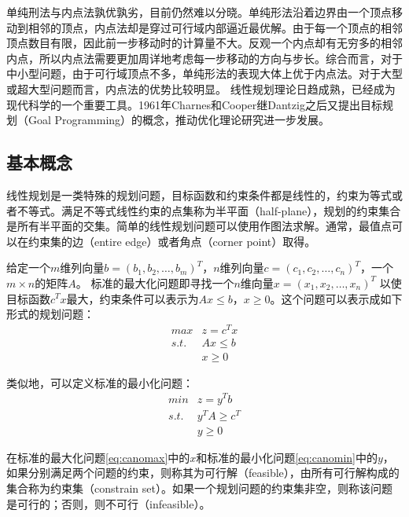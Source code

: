 单纯刑法与内点法孰优孰劣，目前仍然难以分晓。单纯形法沿着边界由一个顶点移动到相邻的顶点，内点法却是穿过可行域内部逼近最优解。由于每一个顶点的相邻顶点数目有限，因此前一步移动时的计算量不大。反观一个内点却有无穷多的相邻内点，所以内点法需要更加周详地考虑每一步移动的方向与步长。综合而言，对于中小型问题，由于可行域顶点不多，单纯形法的表现大体上优于内点法。对于大型或超大型问题而言，内点法的优势比较明显。
线性规划理论日趋成熟，已经成为现代科学的一个重要工具。1961年Charnes和Cooper\cite{charnes1957management}继Dantzig之后又提出目标规划（Goal Programming）的概念，推动优化理论研究进一步发展。

\subsection{基本概念}
线性规划是一类特殊的规划问题，目标函数和约束条件都是线性的，约束为等式或者不等式。满足不等式线性约束的点集称为半平面（half-plane），规划的约束集合是所有半平面的交集。简单的线性规划问题可以使用作图法求解。通常，最值点可以在约束集的边（entire edge）或者角点（corner point）取得。

给定一个$m$维列向量$b=(b_1,b_2,\ldots, b_m )^T$，$n$维列向量$c=(c_1,c_2,\ldots, c_n )^T$，一个$m\times n$的矩阵$A$。
标准的最大化问题即寻找一个$n$维向量$x=(x_1,x_2,\ldots, x_n )^T$ 以使目标函数$c^T x$最大，约束条件可以表示为$Ax \le b$，$x \ge 0$。这个问题可以表示成如下形式的规划问题：
\begin{equation}\label{eq:canomax}
  \begin{array}{ll}
    \textit{max} & z=c^T x\\
    \textit{s.t.}& Ax \le b \\
    & x \ge 0
  \end{array}
\end{equation}

类似地，可以定义标准的最小化问题：
\begin{equation}\label{eq:canomin}
  \begin{array}{ll}
    \textit{min} & z=y^T b\\
    \textit{s.t.}& y^TA \ge c^T \\
    & y \ge 0
  \end{array}
\end{equation}

在标准的最大化问题\eqref{eq:canomax}中的$x$和标准的最小化问题\eqref{eq:canomin}中的$y$，如果分别满足两个问题的约束，则称其为可行解（feasible），由所有可行解构成的集合称为约束集（constrain set）。如果一个规划问题的约束集非空，则称该问题是可行的；否则，则不可行（infeasible）。

